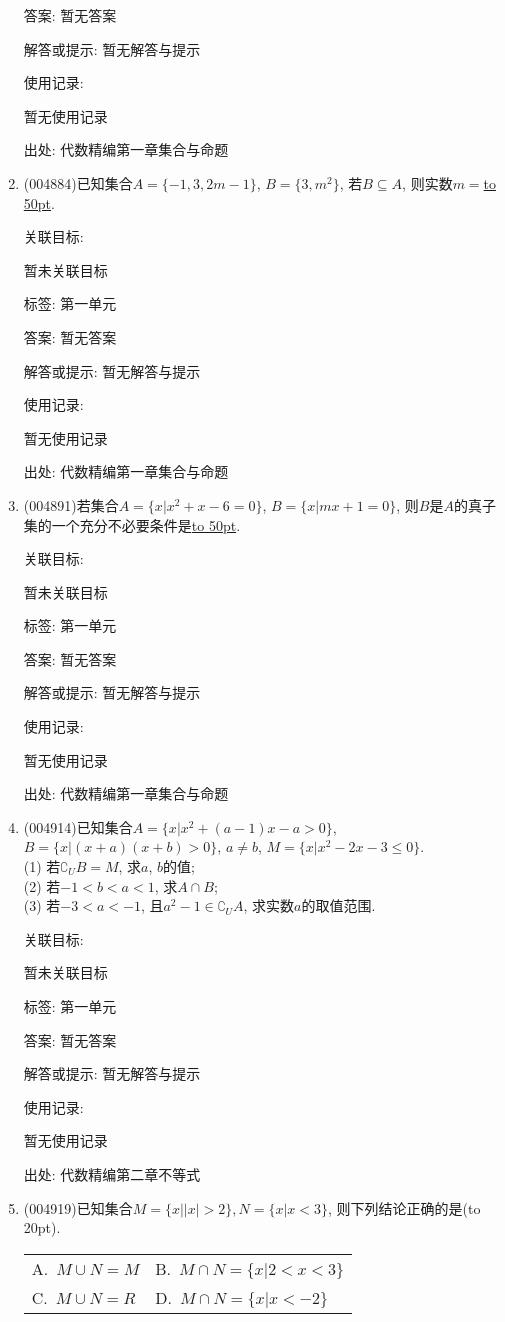 \documentclass[10pt,a4paper]{article}
\newcommand{\blank}[1]{\underline{\hbox to #1pt{}}}
\newcommand{\bracket}[1]{(\hbox to #1pt{})}
\newcommand{\twoch}[4]{\par\begin{tabular}{p{.46\textwidth}p{.46\textwidth}}
A.~#1& B.~#2\\
C.~#3& D.~#4
\end{tabular}}
\begin{document}
\begin{enumerate}[1.]
答案: 暂无答案

解答或提示: 暂无解答与提示

使用记录:

暂无使用记录


出处: 代数精编第一章集合与命题
\item { (004884)}已知集合$A=\{-1,3,2m-1\}$, $B=\{3,m^2\}$, 若$B\subseteq A$, 则实数$m=$\blank{50}.


关联目标:

暂未关联目标



标签: 第一单元

答案: 暂无答案

解答或提示: 暂无解答与提示

使用记录:

暂无使用记录


出处: 代数精编第一章集合与命题
\item { (004891)}若集合$A=\{x|x^2+x-6=0\}$, $B=\{x|mx+1=0\}$, 则$B$是$A$的真子集的一个充分不必要条件是\blank{50}.


关联目标:

暂未关联目标



标签: 第一单元

答案: 暂无答案

解答或提示: 暂无解答与提示

使用记录:

暂无使用记录


出处: 代数精编第一章集合与命题
\item { (004914)}已知集合$A=\{x|x^2+(a-1)x-a>0\}$, $B=\{x|(x+a)(x+b)>0\}$, $a\ne b$, $M=\{x|x^2-2x-3\le 0\}$.\\
(1) 若$\complement_UB=M$, 求$a$, $b$的值;\\
(2) 若$-1<b<a<1$, 求$A\cap B$;\\
(3) 若$-3<a<-1$, 且$a^2-1\in \complement_UA$, 求实数$a$的取值范围.


关联目标:

暂未关联目标



标签: 第一单元

答案: 暂无答案

解答或提示: 暂无解答与提示

使用记录:

暂无使用记录


出处: 代数精编第二章不等式
\item { (004919)}已知集合$M=\{x||x|>2\},N=\{x|x<3\}$, 则下列结论正确的是\bracket{20}.
\twoch{$M\cup N=M$}{$M\cap N=\{x|2<x<3\}$}{$M\cup N=R$}{$M\cap N=\{x|x<-2\}$}



\end{enumerate}
\end{document}
